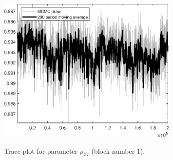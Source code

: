 \begin{figure}[H]
\centering
  \includegraphics[width=0.8\textwidth]{RBC_growth/graphs/TracePlot_rho_ZI_blck_1}\\
    \caption{Trace plot for parameter ${\rho_{ZI}}$ (block number 1).}
\end{figure}
